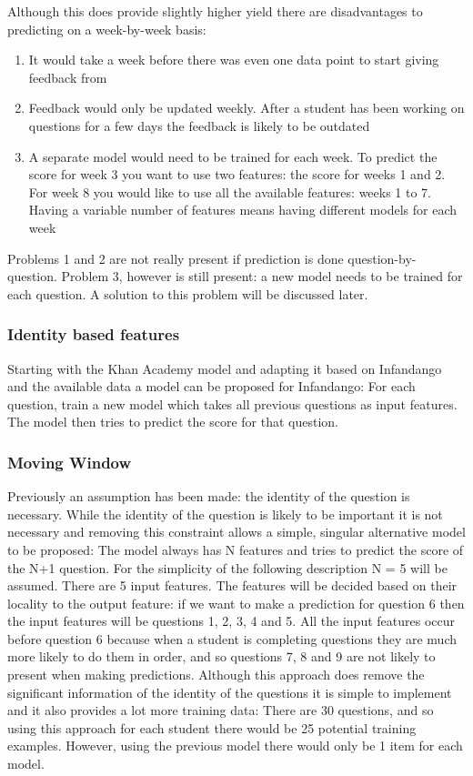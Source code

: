 Although this does provide slightly higher yield there are disadvantages to predicting on a week-by-week basis:

\begin{enumerate}
\item It would take a week before there was even one data point to start giving feedback from
\item Feedback would only be updated weekly. After a student has been working on questions for a few days the feedback is likely to be outdated
\item A separate model would need to be trained for each week. To predict the score for week 3 you want to use two features: the score for weeks 1 and 2. For week 8 you would like to use all the available features: weeks 1 to 7. Having a variable number of features means having different models for each week
\end{enumerate}

Problems 1 and 2 are not really present if prediction is done question-by-question. Problem 3, however is still present: a new model needs to be trained for each question. A solution to this problem will be discussed later.

\subsubsection{Identity based features}
Starting with the Khan Academy model and adapting it based on Infandango and the available data a model can be proposed for Infandango: For each question, train a new model which takes all previous questions as input features. The model then tries to predict the score for that question.

\subsubsection{Moving Window}
Previously an assumption has been made: the identity of the question is necessary. While the identity of the question is likely to be important it is not necessary and removing this constraint allows a simple, singular alternative model to be proposed: The model always has N features and tries to predict the score of the N+1 question. For the simplicity of the following description N = 5 will be assumed.
There are 5 input features. The features will be decided based on their locality to the output feature: if we want to make a prediction for question 6 then the input features will be questions 1, 2, 3, 4 and 5. All the input features occur before question 6 because when a student is completing questions they are much more likely to do them in order, and so questions 7, 8 and 9 are not likely to present when making predictions. 
Although this approach does remove the significant information of the identity of the questions it is simple to implement and it also provides a lot more training data: There are 30 questions, and so using this approach for each student there would be 25 potential training examples. However, using the previous model there would only be 1 item for each model.



